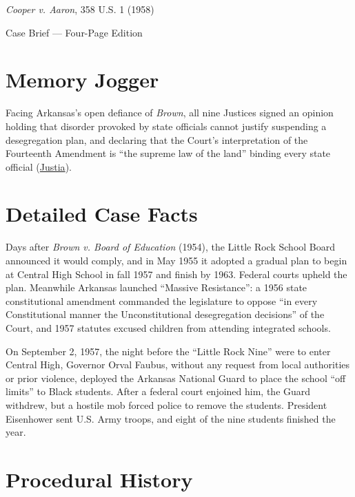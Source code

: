 \documentclass[12pt]{article}
\begin{document}
\begin{center}
{\LARGE \textit{Cooper v. Aaron}, 358 U.S. 1 (1958)\par}
\vspace{0.8em}
{\large Case Brief --- Four-Page Edition\par}
\end{center}
\vspace{1em}

\section{Memory Jogger}

Facing Arkansas's open defiance of \textit{Brown}, all nine Justices signed an opinion holding that disorder provoked by state officials cannot justify suspending a desegregation plan, and declaring that the Court's interpretation of the Fourteenth Amendment is ``the supreme law of the land'' binding every state official (\href{https://supreme.justia.com/cases/federal/us/358/1/}{Justia}).

\section{Detailed Case Facts}

Days after \textit{Brown v. Board of Education} (1954), the Little Rock School Board announced it would comply, and in May 1955 it adopted a gradual plan to begin at Central High School in fall 1957 and finish by 1963. Federal courts upheld the plan. Meanwhile Arkansas launched ``Massive Resistance'': a 1956 state constitutional amendment commanded the legislature to oppose ``in every Constitutional manner the Unconstitutional desegregation decisions'' of the Court, and 1957 statutes excused children from attending integrated schools.

On September 2, 1957, the night before the ``Little Rock Nine'' were to enter Central High, Governor Orval Faubus, without any request from local authorities or prior violence, deployed the Arkansas National Guard to place the school ``off limits'' to Black students. After a federal court enjoined him, the Guard withdrew, but a hostile mob forced police to remove the students. President Eisenhower sent U.S. Army troops, and eight of the nine students finished the year.

\section{Procedural History}
\end{document}
